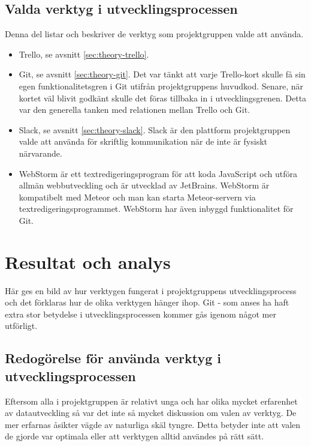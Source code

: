 \subsection{Valda verktyg i utvecklingsprocessen}
Denna del listar och beskriver de verktyg som projektgruppen valde att använda.
\begin{itemize}
  \item Trello, se avsnitt \ref{sec:theory-trello}.
  \item Git, se avsnitt \ref{sec:theory-git}. Det var tänkt att varje Trello-kort skulle få sin egen funktionalitetsgren i Git utifrån projektgruppens huvudkod. Senare, när kortet väl blivit godkänt skulle det föras tillbaka in i utvecklingsgrenen. Detta var den generella tanken med relationen mellan Trello och Git.
  \item Slack, se avsnitt \ref{sec:theory-slack}. Slack är den plattform projektgruppen valde att använda för skriftlig kommunikation när de inte är fysiskt närvarande.
  \item WebStorm är ett textredigeringsprogram för att koda JavaScript och utföra allmän webbutveckling och är utvecklad av JetBrains. \cite{website:webstorm} WebStorm är kompatibelt med Meteor och man kan starta Meteor-servern via textredigeringsprogrammet. WebStorm har även inbyggd funktionalitet för Git.
\end{itemize}

\section{Resultat och analys}
\label{cha:jonathan-results}
Här ges en bild av hur verktygen fungerat i projektgruppens utvecklingsprocess och det förklaras hur de olika verktygen hänger ihop. Git - som anses ha haft extra stor betydelse i utvecklingsprocessen kommer gås igenom något mer utförligt.

\subsection{Redogörelse för använda verktyg i utvecklingsprocessen}
Eftersom alla i projektgruppen är relativt unga och har olika mycket erfarenhet av datautveckling så var det inte så mycket diskussion om valen av verktyg. De mer erfarnas åsikter vägde av naturliga skäl tyngre. Detta betyder inte att valen de gjorde var optimala eller att verktygen alltid användes på rätt sätt.

